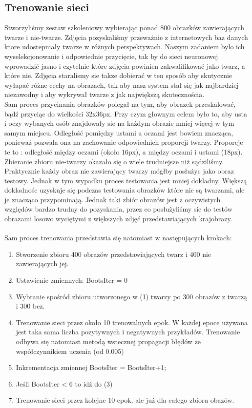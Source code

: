 \documentclass[11pt,a4paper]{article}
\begin{document}
\subsection{Trenowanie sieci}
\indent
Stworzyliśmy zestaw szkoleniowy wybierając ponad 800 obrazków zawierających twarze i nie-twarze. 
Zdjęcia pozyskaliśmy przeważnie z internetowych baz danych ktore udostepniały twarze w różnych perspektywach.
Naszym zadaniem bylo ich wyselekcjonowanie i odpowiednie przycięcie, tak by do sieci neuronowej wprowadzić 
jasno i czytelnie które zdjęcia powinien zakwalifikować jako twarz, a które nie. Zdjęcia staralismy sie takze dobierać w ten
sposób aby skutycznie wyłapać różne cechy na obrazach, tak aby nasz system stał się jak najbardziej niezawodny i aby 
wykrywał twarze z jak największą skutecznościa.\\
\indent
Sam proces przycinania obrazków polegał na tym, aby obrazek przeskalować, bądź przyciąc do wielkości 32x36px. Przy czym
głownym celem było to, aby usta i oczy wybanych osób znajdowały sie na każdym obrazie mniej więcej w tym samym miejscu.
Odległość pomiędzy ustami a oczami jest bowiem znacząca, ponieważ pozwala ona na zachowanie odpowiednich proporcji twarzy.
Proporcje te to : odległość między oczami (około 16px), a między oczami i ustami (18px).\\
\indent
Zbieranie zbioru nie-twarzy okazało się o wiele trudniejsze niż sądziliśmy. Praktycznie każdy obraz nie zawierający twarzy
mógłby posłużyc jako obraz testowy. Jednak w tym wypadku proces testowania jest mniej dokladny. Większą dokladnośc
uzyskuje się podczas testowania obrazków które nie są twarzami, ale je znacząco przypominają. Jednak taki zbiór obrazów
jest z oczywistych względów bardzo trudny do pozyskania, przez co posłużyliśmy sie do testów obrazami losowo wyciętymi
z większych zdjęć przedstawiających krajobrazy. \\\\
\indent
Sam proces trenowania przedstawia się natomiast w następujących krokach:
 \begin{enumerate}
\item Stworzenie zbioru 400 obrazów przedstawiających twarz i 400 nie zawierających jej.
\item Ustawienie zmiennych: BootsIter = 0
\item Wybranie spośród zbioru utworzonego w (1) twarzy po 300 obrazów z twarzą i 300 bez.
\item Trenowanie sieci przez około 10 trenowalnych epok. W każdej epoce używana jest taka sama liczba pozytywnych
i negatywnych przykładów. Trenowanie odbywa się natomiast metodą wstecznej propagacji błędów ze współczynnikiem uczenia
(od 0.005)
\item Inkrementacja zmiennej BootsIter = BootsIter+1;
\item Jeśli BootsIter < 6 to idź do (3)
\item Trenowanie sieci przez kolejne 10 epok, ale już dla całego zbioru obazów.
 \end{enumerate}
\end{document}
